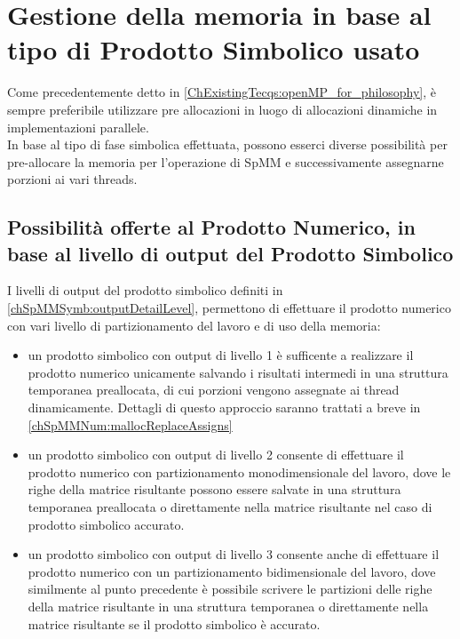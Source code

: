 \section{Gestione della memoria in base al tipo di Prodotto Simbolico usato}
Come precedentemente detto in \ref{ChExistingTecqs:openMP_for_philosophy},
è sempre preferibile utilizzare pre allocazioni in luogo di allocazioni dinamiche 
in implementazioni parallele.\\
In base al tipo di fase simbolica effettuata, possono esserci diverse possibilità per 
pre-allocare la memoria per l'operazione di SpMM e successivamente assegnarne 
porzioni ai vari threads.\\
\subsection{Possibilità offerte al Prodotto Numerico, in base al livello di output del Prodotto Simbolico}
\label{chSpMMNum:funcsMultiImplePurpose}
I livelli di output del prodotto simbolico definiti in \ref{chSpMMSymb:outputDetailLevel}, 
permettono di effettuare il prodotto numerico con vari livello di 
partizionamento del lavoro e di uso della memoria:
\begin{itemize}
	\item un prodotto simbolico con output di livello 1 è sufficente a realizzare 
		  il prodotto numerico unicamente salvando i risultati intermedi in una struttura temporanea preallocata,
		  di cui porzioni vengono assegnate ai thread dinamicamente.
		  Dettagli di questo approccio saranno trattati a breve in \ref{chSpMMNum:mallocReplaceAssigns}
	\item un prodotto simbolico con output di livello 2 consente di effettuare il prodotto numerico
		  con partizionamento monodimensionale del lavoro, dove le righe della matrice risultante 
		  possono essere salvate in una struttura temporanea preallocata
		  o direttamente nella matrice risultante nel caso di prodotto simbolico accurato.
	\item un prodotto simbolico con output di livello 3 consente anche di effettuare il prodotto numerico
		  con un partizionamento bidimensionale del lavoro, dove similmente al punto precedente è possibile
		  scrivere le partizioni delle righe della matrice risultante 
		  in una struttura temporanea o direttamente nella matrice risultante se il prodotto simbolico è accurato.
\end{itemize}

